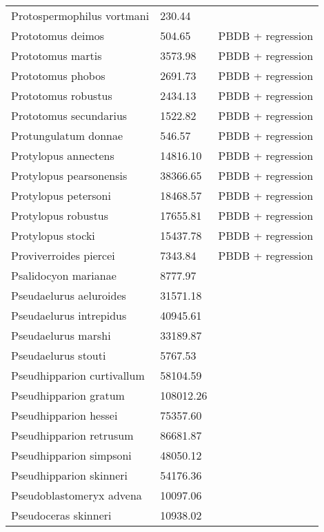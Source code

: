 \documentclass{article}
\begin{document}
\begin{center}
\begin{longtable}{p{} p{} p{}}
    Protospermophilus vortmani & 230.44 & \cite{Tomiya2013} \\ 
    Prototomus deimos & 504.65 & PBDB + regression \\ 
    Prototomus martis & 3573.98 & PBDB + regression \\ 
    Prototomus phobos & 2691.73 & PBDB + regression \\ 
    Prototomus robustus & 2434.13 & PBDB + regression \\ 
    Prototomus secundarius & 1522.82 & PBDB + regression \\ 
    Protungulatum donnae & 546.57 & PBDB + regression \\ 
    Protylopus annectens & 14816.10 & PBDB + regression \\ 
    Protylopus pearsonensis & 38366.65 & PBDB + regression \\ 
    Protylopus petersoni & 18468.57 & PBDB + regression \\ 
    Protylopus robustus & 17655.81 & PBDB + regression \\ 
    Protylopus stocki & 15437.78 & PBDB + regression \\ 
    Proviverroides piercei & 7343.84 & PBDB + regression \\ 
    Psalidocyon marianae & 8777.97 & \cite{Tomiya2013} \\ 
    Pseudaelurus aeluroides & 31571.18 & \cite{Tomiya2013} \\ 
    Pseudaelurus intrepidus & 40945.61 & \cite{Tomiya2013} \\ 
    Pseudaelurus marshi & 33189.87 & \cite{Tomiya2013} \\ 
    Pseudaelurus stouti & 5767.53 & \cite{Tomiya2013} \\ 
    Pseudhipparion curtivallum & 58104.59 & \cite{Tomiya2013} \\ 
    Pseudhipparion gratum & 108012.26 & \cite{Tomiya2013} \\ 
    Pseudhipparion hessei & 75357.60 & \cite{Tomiya2013} \\ 
    Pseudhipparion retrusum & 86681.87 & \cite{Tomiya2013} \\ 
    Pseudhipparion simpsoni & 48050.12 & \cite{Tomiya2013} \\ 
    Pseudhipparion skinneri & 54176.36 & \cite{Tomiya2013} \\ 
    Pseudoblastomeryx advena & 10097.06 & \cite{Tomiya2013} \\ 
    Pseudoceras skinneri & 10938.02 & \cite{Tomiya2013} \\ 

\end{longtable}
\end{center}
\end{document}
